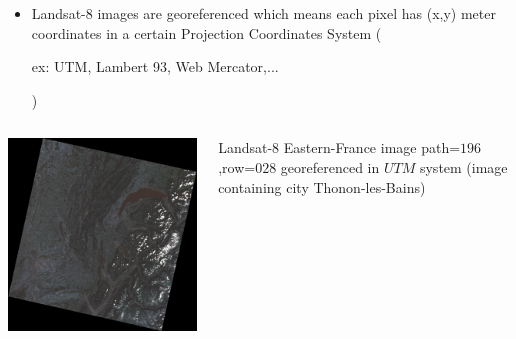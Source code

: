 \documentclass[c]{beamer}
\begin{document}
\begin{frame}
\begin{itemize}
 \item Landsat-8 images are georeferenced which means each pixel has (x,y) meter coordinates in a certain Projection Coordinates 
System (\begin{itshape}ex: UTM, Lambert 93, Web Mercator,...\end{itshape})
\end{itemize}

\begin{columns}
\begin{column}{0.30\textwidth}
\begin{overlayarea}{\linewidth}{5cm}
  \centering\vfill
  \includegraphics[scale=0.2]{images/georeferencing/Thonon_landsat.png}
\end{overlayarea}
\end{column}
\begin{column}{0.30\textwidth}
\begin{overlayarea}{\linewidth}{1cm}
  \centering
  \tiny Landsat-8 Eastern-France image path=$196$,row=$028$ georeferenced in $UTM$ system (image containing city Thonon-les-Bains)\par
\end{overlayarea}
\end{column}


\end{columns}
\end{frame}
\end{document}
